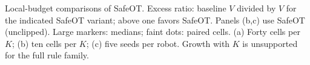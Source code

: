 Local-budget comparisons of SafeOT. Excess ratio: baseline $V$ divided by $V$ for the indicated SafeOT variant; above one favors SafeOT. Panels (b,c) use SafeOT (unclipped). Large markers: medians; faint dots: paired cells. (a) Forty cells per $K$; (b) ten cells per $K$; (c) five seeds per robot. Growth with $K$ is unsupported for the full rule family.
